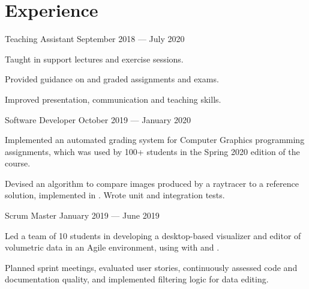 \section*{Experience}

\begin{cventries}
{Teaching Assistant}
{September 2018 --- July 2020} %
{}
{%
	\begin{cvitems}
		\item Taught in support lectures and exercise sessions.
		\item Provided guidance on and graded assignments and exams.
		\item Improved presentation, communication and teaching skills.
	\end{cvitems}
}
{Software Developer}
{October 2019 --- January 2020} %
{}
{
	\begin{cvitems}
		\item Implemented an automated grading system for Computer Graphics programming assignments, which was used by 100+ students in the Spring 2020 edition of the course.
		\item Devised an algorithm to compare images produced by a raytracer to a reference solution, implemented in . Wrote unit and integration tests.
	\end{cvitems}
}
{Scrum Master}
{January 2019 --- June 2019} %
{}
{%
	\begin{cvitems}
	\item Led a team of 10 students in developing a desktop-based visualizer and editor of volumetric data in an Agile environment, using  with  and \cvlanguage{OpenGL}.
	\item Planned sprint meetings, evaluated user stories, continuously assessed code and documentation quality, and implemented filtering logic for data editing.
	\end{cvitems}
}
\end{cventries}
